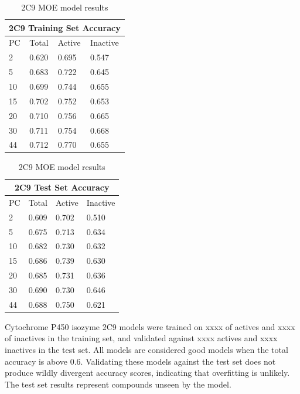 \begin{table}[!h]
\begin{minipage}{.5\linewidth}
\centering
\begin{tabular}{|l|l|l|l|}
\hline
\multicolumn{4}{|c|}{2C9 Training Set Accuracy} \\ \hline
PC & Total          & Active          & Inactive\\ \hline
2  & 0.620          & 0.695           & 0.547   \\ \hline
5  & 0.683          & 0.722           & 0.645   \\ \hline
10 & 0.699          & 0.744           & 0.655   \\ \hline
15 & 0.702          & 0.752           & 0.653   \\ \hline
20 & 0.710          & 0.756           & 0.665   \\ \hline
30 & 0.711          & 0.754           & 0.668   \\ \hline
44 & 0.712          & 0.770           & 0.655   \\ \hline
\end{tabular}
\end{minipage}
\begin{minipage}{.5\linewidth}
\centering
\begin{tabular}{|l|l|l|l|}
\hline
\multicolumn{4}{|c|}{2C9 Test Set Accuracy}     \\ \hline
PC & Total          & Active          & Inactive\\ \hline
2  & 0.609          & 0.702           & 0.510   \\ \hline
5  & 0.675          & 0.713           & 0.634   \\ \hline
10 & 0.682          & 0.730           & 0.632   \\ \hline
15 & 0.686          & 0.739           & 0.630   \\ \hline
20 & 0.685          & 0.731           & 0.636   \\ \hline
30 & 0.690          & 0.730           & 0.646   \\ \hline
44 & 0.688          & 0.750           & 0.621   \\ \hline
\end{tabular}
\end{minipage}
\caption{2C9 MOE model results}
\end{table}

Cytochrome P450 isozyme 2C9 models were trained on xxxx of actives and xxxx of inactives in the training set, and validated against xxxx actives and xxxx inactives in the test set. All models are considered good models when the total accuracy is above 0.6. Validating these models against the test set does not produce wildly divergent accuracy scores, indicating that overfitting is unlikely. The test set results represent compounds unseen by the model. 

